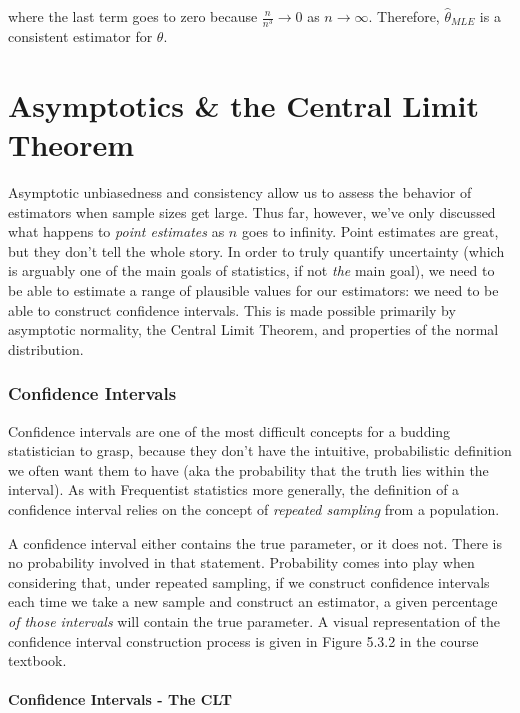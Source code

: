\documentclass[
  letterpaper,
  DIV=11,
  numbers=noendperiod]{scrreprt}
\begin{document}
where the last term goes to zero because \(\frac{n}{n^3} \to 0\) as
\(n \to \infty\). Therefore, \(\hat{\theta}_{MLE}\) is a consistent
estimator for \(\theta\).


\chapter{Asymptotics \& the Central Limit
Theorem}\label{asymptotics-the-central-limit-theorem}

Asymptotic unbiasedness and consistency allow us to assess the behavior
of estimators when sample sizes get large. Thus far, however, we've only
discussed what happens to \emph{point estimates} as \(n\) goes to
infinity. Point estimates are great, but they don't tell the whole
story. In order to truly quantify uncertainty (which is arguably one of
the main goals of statistics, if not \emph{the} main goal), we need to
be able to estimate a range of plausible values for our estimators: we
need to be able to construct confidence intervals. This is made possible
primarily by asymptotic normality, the Central Limit Theorem, and
properties of the normal distribution.

\subsection*{Confidence Intervals}\label{confidence-intervals}

Confidence intervals are one of the most difficult concepts for a
budding statistician to grasp, because they don't have the intuitive,
probabilistic definition we often want them to have (aka the probability
that the truth lies within the interval). As with Frequentist statistics
more generally, the definition of a confidence interval relies on the
concept of \emph{repeated sampling} from a population.

A confidence interval either contains the true parameter, or it does
not. There is no probability involved in that statement. Probability
comes into play when considering that, under repeated sampling, if we
construct confidence intervals each time we take a new sample and
construct an estimator, a given percentage \emph{of those intervals}
will contain the true parameter. A visual representation of the
confidence interval construction process is given in Figure 5.3.2 in the
course textbook.

\subsubsection*{Confidence Intervals - The
CLT}\label{confidence-intervals---the-clt}
\end{document}
